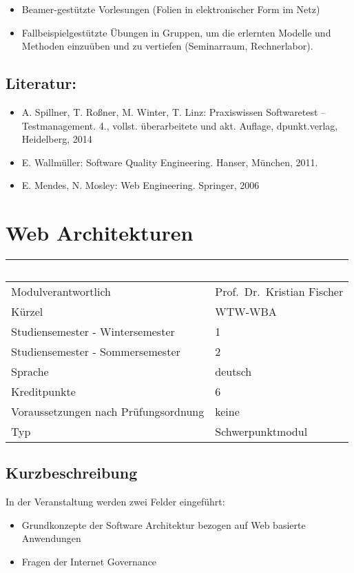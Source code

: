 \begin{itemize}
\item
  Beamer-gestützte Vorlesungen (Folien in elektronischer Form im Netz)
\item
  Fallbeispielgestützte Übungen in Gruppen, um die erlernten Modelle und
  Methoden einzuüben und zu vertiefen (Seminarraum, Rechnerlabor).
\end{itemize}

\section*{Literatur:}\label{literatur-18}

\begin{itemize}
\item
  A. Spillner, T. Roßner, M. Winter, T. Linz: Praxiswissen Softwaretest
  -- Testmanagement. 4., vollst. überarbeitete und akt. Auflage,
  dpunkt.verlag, Heidelberg, 2014
\item
  E. Wallmüller: Software Quality Engineering. Hanser, München, 2011.
\item
  E. Mendes, N. Mosley: Web Engineering. Springer, 2006
\end{itemize}

\chapter{Web Architekturen}\label{web-architekturen}

\begin{longtable}[]{@{}ll@{}}
\toprule
~ & ~\tabularnewline
\midrule
\endhead
Modulverantwortlich & Prof.~Dr.~Kristian Fischer\tabularnewline
Kürzel & WTW-WBA\tabularnewline
Studiensemester - Wintersemester & 1\tabularnewline
Studiensemester - Sommersemester & 2\tabularnewline
Sprache & deutsch\tabularnewline
Kreditpunkte & 6\tabularnewline
Voraussetzungen nach Prüfungsordnung & keine\tabularnewline
Typ & Schwerpunktmodul\tabularnewline
\bottomrule
\end{longtable}

\section*{Kurzbeschreibung}\label{kurzbeschreibung-12}

In der Veranstaltung werden zwei Felder eingeführt:

\begin{itemize}
\item
  Grundkonzepte der Software Architektur bezogen auf Web basierte
  Anwendungen
\item
  Fragen der Internet Governance
\end{itemize}

